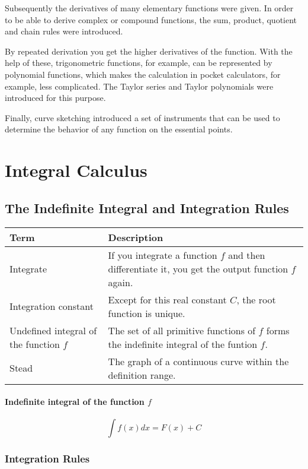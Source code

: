 \documentclass{book}
\begin{document}
Subsequently the derivatives of many elementary functions were given. In order to be able to derive complex or compound functions, the sum, product, quotient and chain rules were introduced.

By repeated derivation you get the higher derivatives of the function. With the help of these, trigonometric functions, for example, can be represented by polynomial functions, which makes the calculation in pocket calculators, for example, less complicated. The Taylor series and Taylor polynomials were introduced for this purpose.

Finally, curve sketching introduced a set of instruments that can be used to determine the behavior of any function on the essential points.



\chapter{Integral Calculus}

\section{The Indefinite Integral and Integration Rules}

\begin{tabular}{p{3cm}p{10.5cm}}
  \toprule
  \textbf{Term} & \textbf{Description} \\
  \midrule
  Integrate & If you integrate a function $f$ and then differentiate it, you get the output function $f$ again.\\
  \midrule
  Integration constant & Except for this real constant $C$, the root function is unique.\\
  \midrule
  Undefined integral of the function $f$ & The set of all primitive functions of $f$ forms the indefinite integral of the funtion $f$.\\
  \midrule
  Stead & The graph of a continuous curve within the definition range.\\
  \bottomrule
\end{tabular}

\subsubsection{Indefinite integral of the function $f$}

\[
  \int f(x)dx = F(x)+C
\]

\subsection{Integration Rules}
\end{document}
